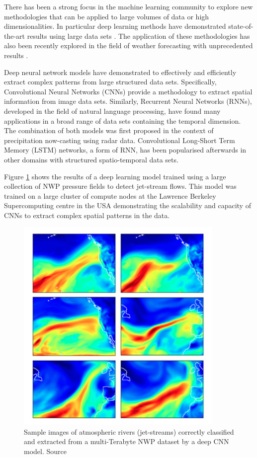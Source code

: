 \medskip

There has been a strong focus in the machine learning community to explore new methodologies that can be applied to large volumes of data or high dimensionalities. In particular deep learning methods \citep{lecun2015deep} have demonstrated state-of-the-art results using large data sets \citep{deng2009imagenet,openimages}. The application of these methodologies has also been recently explored in the field of weather forecasting with unprecedented results \citep{xingjian2015convolutional,liu2016application,rasp2018deep}.

\medskip

Deep neural network models have demonstrated to effectively and efficiently extract complex patterns from large structured data sets. Specifically, Convolutional Neural Networks (CNNs) provide a methodology to extract spatial information from image data sets. Similarly, Recurrent Neural Networks (RNNs), developed in the field of natural language processing, have found many applications in a broad range of data sets containing the temporal dimension. The combination of both models was first proposed in the context of precipitation now-casting \citep{xingjian2015convolutional} using radar data. Convolutional Long-Short Term Memory (LSTM) networks, a form of RNN, has been popularised afterwards in other domains with structured spatio-temporal data sets. 

\medskip

Figure \ref{deep_clasif} shows the results of a deep learning model trained using a large collection of NWP pressure fields to detect jet-stream flows. This model was trained on a large cluster of compute nodes at the Lawrence Berkeley Supercomputing centre in the USA demonstrating the scalability and capacity of CNNs to extract complex spatial patterns in the data.

\medskip

\begin{figure}[h]
 \centerline{\includegraphics[width=10cm]{deep_classif.png}} \caption{Sample images of atmospheric rivers (jet-streams) correctly classified and extracted from a multi-Terabyte NWP dataset by a deep CNN model. Source \citep{liu2016application}}\label{deep_clasif}
\end{figure}

